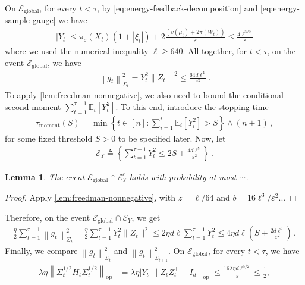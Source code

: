 \documentclass{article}
\newtheorem{lemma}[lemma]{Lemma}
\newcommand{\E}{\mathbb E}
\newcommand{\op}{\mathrm{op}}
\newcommand{\1}{\mathbf 1}
\newcommand{\eps}{\varepsilon}
\newcommand{\norm}[1]{\left\lVert #1\right\rVert}
\newcommand{\normm}[2]{\left\lVert #1\right\rVert_{#2}}
\begin{document}
On $\mathcal E_{\mathrm{global}}$, for every $t < \tau$, by \eqref{eq:energy-feedback-decomposition} and \eqref{eq:energy-sample-gauge} we have
\begin{align}
    |Y_t|
    \leq \pi_\eps(X_t)(1+|\xi_t|)+2\frac{\left(v(\mu_t) + 2 \pi(W_t)\right)}{\eps}
    \leq \frac{4\ell^{3/2}}{\eps}
    \label{eq:energy-sample-gauge-bound}
\end{align}
where we used
the numerical inequality $\ell\geq640$.
All together,
for $t < \tau$, on the event $\mathcal E_{\mathrm{global}}$, we have
\begin{align}
    \normm{g_t}{\Sigma_t}^2
    =Y_t^2\norm{Z_t}^2
    \leq\frac{64d\ell^4}{\eps^2}\,.
    \label{eq:energy-sample-gauge-bound-2}
\end{align}
To apply \cref{lem:freedman-nonnegative}, we also need to bound the conditional second moment $\sum_{t=1}^{\tau-1}\E_t[Y_t^2]$.
To this end, introduce the stopping time
\begin{align}
    \tau_{\mathrm{moment}}(S)
    =\min\left\{
    t \in [n]: \sum_{i=1}^{t} \E_i[Y_i^2] > S
    \right\}\wedge (n+1)\,,
\end{align}
for some fixed threshold $S>0$ to be specified later.
Now, let
\begin{align}
    \mathcal E_Y
    \triangleq
    \left\{
    \sum_{t=1}^{\tau-1}Y_t^2
    \leq
    2S + \frac{4d\ell^5}{\eps^2}
    \right\}\,.
    \label{eq:interval-feedback-bound}
\end{align}
\begin{lemma}
    The event $\mathcal E_\mathrm{global} \cap \mathcal E_Y^c$ holds with probability at most $\cdots$.
\end{lemma}
\begin{proof}
    Apply \cref{lem:freedman-nonnegative}, with  $z=\ell/64$ and $b=16\ell^3/\eps^2$...
\end{proof}
Therefore, on the event $\mathcal E_\mathrm{global} \cap \mathcal E_Y$, we get
\begin{align}
    \frac{\eta}{2}\sum_{t=1}^{\tau-1}\normm{g_t}{\Sigma_t}^2
    =
    \frac{\eta}{2}\sum_{t=1}^{\tau-1}Y_t^2\|Z_t\|^2
    \leq
    2\eta d\ell
    \sum_{t=1}^{\tau-1}Y_t^2
    \leq
    4\eta d\ell
    \left(
    S + \frac{2d\ell^5}{\eps^2}
    \right)\,.
    \label{eq:interval-energy-bound}
\end{align}
Finally, we compare $\normm{g_t}{\Sigma_t}^2$ and $\normm{g_t}{\Sigma_{t+1}}^2$.
On $\mathcal E_{\mathrm{global}}$, for every $t<\tau$, we have
\begin{align}
    \lambda\eta\left\|
    \Sigma_t^{1/2}H_t\Sigma_t^{1/2}
    \right\|_{\op}
     & =\lambda\eta|Y_t|\|Z_tZ_t^\top-I_d\|_{\op}
    \leq\frac{16\lambda\eta d\ell^{5/2}}{\eps}
    \leq\frac12,
\end{align}
\end{document}
